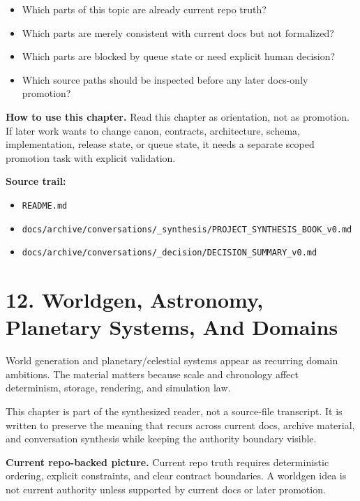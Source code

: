 \documentclass[10.5pt,a4paper,openany]{book}
\begin{document}
\begin{itemize}
\item Which parts of this topic are already current repo truth?
\item Which parts are merely consistent with current docs but not formalized?
\item Which parts are blocked by queue state or need explicit human decision?
\item Which source paths should be inspected before any later docs-\allowbreak{}only promotion?
\end{itemize}

\textbf{How to use this chapter.} Read this chapter as orientation, not as promotion.\allowbreak{} If later work wants to change canon, contracts, architecture, schema, implementation, release state, or queue state, it needs a separate scoped promotion task with explicit validation.\allowbreak{}


\textbf{Source trail:}


\begin{itemize}
\item \texttt{README.\allowbreak{}md}
\item \texttt{docs/\allowbreak{}archive/\allowbreak{}conversations/\allowbreak{}\_\allowbreak{}synthesis/\allowbreak{}PROJECT\_\allowbreak{}SYNTHESIS\_\allowbreak{}BOOK\_\allowbreak{}v0.\allowbreak{}md}
\item \texttt{docs/\allowbreak{}archive/\allowbreak{}conversations/\allowbreak{}\_\allowbreak{}decision/\allowbreak{}DECISION\_\allowbreak{}SUMMARY\_\allowbreak{}v0.\allowbreak{}md}
\end{itemize}


\section{12. Worldgen, Astronomy, Planetary Systems, And Domains}

World generation and planetary/\allowbreak{}celestial systems appear as recurring domain ambitions.\allowbreak{} The material matters because scale and chronology affect determinism, storage, rendering, and simulation law.\allowbreak{}


This chapter is part of the synthesized reader, not a source-\allowbreak{}file transcript.\allowbreak{} It is written to preserve the meaning that recurs across current docs, archive material, and conversation synthesis while keeping the authority boundary visible.\allowbreak{}


\textbf{Current repo-backed picture.} Current repo truth requires deterministic ordering, explicit constraints, and clear contract boundaries.\allowbreak{} A worldgen idea is not current authority unless supported by current docs or later promotion.\allowbreak{}
\end{document}

